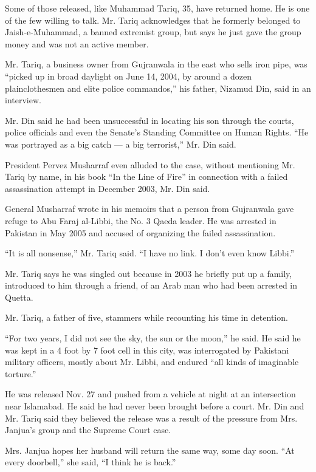 Some of those released, like Muhammad Tariq, 35, have returned home. He
is one of the few willing to talk. Mr. Tariq acknowledges that he
formerly belonged to Jaish-e-Muhammad, a banned extremist group, but
says he just gave the group money and was not an active member.

Mr. Tariq, a business owner from Gujranwala in the east who sells iron
pipe, was ``picked up in broad daylight on June 14, 2004, by around a
dozen plainclothesmen and elite police commandos,'' his father, Nizamud
Din, said in an interview.

Mr. Din said he had been unsuccessful in locating his son through the
courts, police officials and even the Senate's Standing Committee on
Human Rights. ``He was portrayed as a big catch --- a big terrorist,''
Mr. Din said.

President Pervez Musharraf even alluded to the case, without mentioning
Mr. Tariq by name, in his book ``In the Line of Fire'' in connection
with a failed assassination attempt in December 2003, Mr. Din said.

General Musharraf wrote in his memoirs that a person from Gujranwala
gave refuge to Abu Faraj al-Libbi, the No. 3 Qaeda leader. He was
arrested in Pakistan in May 2005 and accused of organizing the failed
assassination.

``It is all nonsense,'' Mr. Tariq said. ``I have no link. I don't even
know Libbi.''

Mr. Tariq says he was singled out because in 2003 he briefly put up a
family, introduced to him through a friend, of an Arab man who had been
arrested in Quetta.

Mr. Tariq, a father of five, stammers while recounting his time in
detention.

``For two years, I did not see the sky, the sun or the moon,'' he said.
He said he was kept in a 4 foot by 7 foot cell in this city, was
interrogated by Pakistani military officers, mostly about Mr. Libbi, and
endured ``all kinds of imaginable torture.''

He was released Nov. 27 and pushed from a vehicle at night at an
intersection near Islamabad. He said he had never been brought before a
court. Mr. Din and Mr. Tariq said they believed the release was a result
of the pressure from Mrs. Janjua's group and the Supreme Court case.

Mrs. Janjua hopes her husband will return the same way, some day soon.
``At every doorbell,'' she said, ``I think he is back.''

